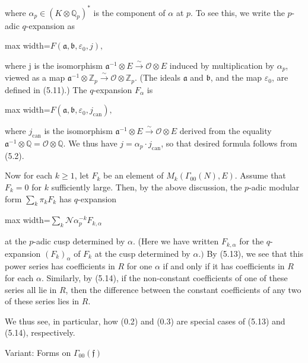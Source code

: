 \documentclass[11pt]{article}
\newcommand{\DFormula}[1]{\par\smallskip\noindent\begin{adjustbox}{max width=\linewidth}$\displaystyle #1$\end{adjustbox}\par\smallskip}
\begin{document}
\par
where \(\alpha _{p}\in (K\otimes \mathbb{Q}_{p})^{\ast}\) is the component of \(\alpha \) at \(p\). To see this, we write the \(p\)-adic \(q\)-expansion as\par
\par
\DFormula{F(𝔞,𝔟,\varepsilon _{0},j),}
\par
where j is the isomorphism \(𝔞^{-1}\otimes E\xrightarrow{\sim}\mathcal{O}\otimes E\) induced by multiplication by \(\alpha _{p}\), viewed as a map \(𝔞^{-1}\otimes \mathbb{Z}_{p}\xrightarrow{\sim}\mathcal{O}\otimes \mathbb{Z}_{p}\). (The ideals \(𝔞\) and \(𝔟\), and the map \(\varepsilon _{0}\), are defined in (5.11).) The \(q\)-expansion \(F_{\alpha }\) is\par
\par
\DFormula{F(𝔞,𝔟,\varepsilon _{0},j_{\mathrm{can}}),}
\par
where \(j_{\mathrm{can}}\) is the isomorphism \(𝔞^{-1}\otimes E\xrightarrow{\sim}\mathcal{O}\otimes E\) derived from the equality \(𝔞^{-1}\otimes \mathbb{Q}=\mathcal{O}\otimes \mathbb{Q}\). We thus have \(j=\alpha _{p}\cdot j_{\mathrm{can}}\), so that desired formula follows from (5.2).\par
\par
Now for each \(k\geq 1\), let \(F_{k}\) be an element of \(M_{k}(\Gamma _{00}(N),E)\). Assume that \(F_{k}=0\) for \(k\) sufficiently large. Then, by the above discussion, the \(p\)-adic modular form \(\sum _{k}\pi _{k}F_{k}\) has \(q\)-expansion\par
\par
\DFormula{\sum _{k}\mathcal{N}\alpha _{p}^{-k}F_{k,\alpha }}
\par
at the \(p\)-adic cusp determined by \(\alpha \). (Here we have written \(F_{k,\alpha }\) for the \(q\)-expansion \((F_{k})_{\alpha }\) of \(F_{k}\) at the cusp determined by \(\alpha .)\) By (5.13), we see that this power series has coefficients in \(R\) for one \(\alpha \) if and only if it has coefficients in \(R\) for each \(\alpha \). Similarly, by (5.14), if the non-constant coefficients of one of these series all lie in \(R\), then the difference between the constant coefficients of any two of these series lies in \(R\).\par
\par
We thus see, in particular, how (0.2) and (0.3) are special cases of (5.13) and (5.14), respectively.\par
\par
Variant: Forms on \(\Gamma _{00}(𝔣)\)\par
\end{document}
